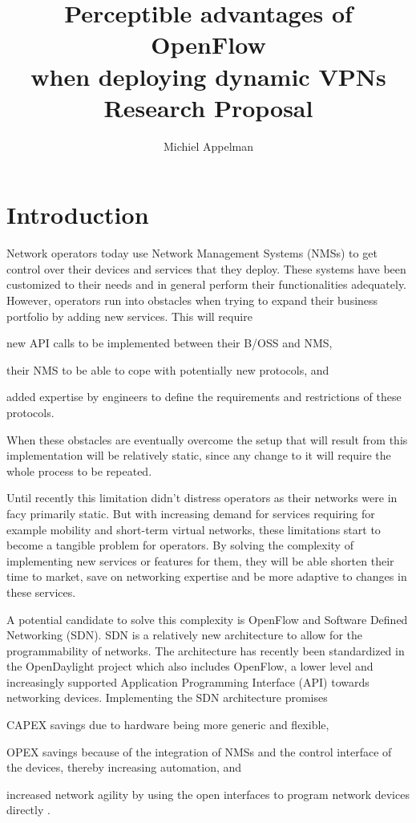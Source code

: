 \documentclass[oneside,twocolumn,8pt,a4paper]{article}
\title{Perceptible advantages of OpenFlow \\
\Large{when deploying dynamic VPNs} \\[0.3cm]
\large{Research Proposal}}
\author{Michiel Appelman}
\begin{document}
	\maketitle
	
	\section{Introduction} %
	\label{sec:introduction}
	Network operators today use Network Management Systems (NMSs) to get control over their devices and services that they deploy. These systems have been customized to their needs and in general perform their functionalities adequately. However, operators run into obstacles when trying to expand their business portfolio by adding new services. This will require 
	\begin{inparaenum}
		\item new API calls to be implemented between their B/OSS and NMS, 
		\item their NMS to be able to cope with potentially new protocols, and
		\item added expertise by engineers to define the requirements and restrictions of these protocols. 
	\end{inparaenum}
	When these obstacles are eventually overcome the setup that will result from this implementation will be relatively static, since any change to it will require the whole process to be repeated.

	Until recently this limitation didn't distress operators as their networks were in facy primarily static. But with increasing demand for services requiring for example mobility and short-term virtual networks, these limitations start to become a tangible problem for operators. By solving the complexity of implementing new services or features for them, they will be able shorten their time to market, save on networking expertise and be more adaptive to changes in these services.
	
	A potential candidate to solve this complexity is OpenFlow \cite{openflow} and Software Defined Networking (SDN). SDN is a relatively new architecture to allow for the programmability of networks. The architecture has recently been standardized in the OpenDaylight project \cite{opendaylight} which also includes OpenFlow, a lower level and increasingly supported Application Programming Interface (API) towards networking devices. Implementing the SDN architecture promises
	\begin{inparaenum}
		\item CAPEX savings due to hardware being more generic and flexible,
		\item OPEX savings because of the integration of NMSs and the control interface of the devices, thereby increasing automation, and
		\item increased network agility by using the open interfaces to program network devices directly \cite{packet-circuit}.
\end{inparaenum} 
			
\end{document}
